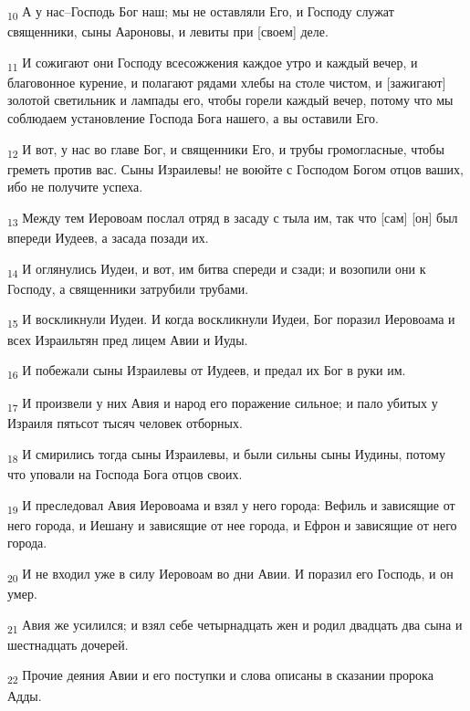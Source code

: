 \begin{tcolorbox}
\textsubscript{10} А у нас--Господь Бог наш; мы не оставляли Его, и Господу служат священники, сыны Аароновы, и левиты при [своем] деле.
\end{tcolorbox}
\begin{tcolorbox}
\textsubscript{11} И сожигают они Господу всесожжения каждое утро и каждый вечер, и благовонное курение, и полагают рядами хлебы на столе чистом, и [зажигают] золотой светильник и лампады его, чтобы горели каждый вечер, потому что мы соблюдаем установление Господа Бога нашего, а вы оставили Его.
\end{tcolorbox}
\begin{tcolorbox}
\textsubscript{12} И вот, у нас во главе Бог, и священники Его, и трубы громогласные, чтобы греметь против вас. Сыны Израилевы! не воюйте с Господом Богом отцов ваших, ибо не получите успеха.
\end{tcolorbox}
\begin{tcolorbox}
\textsubscript{13} Между тем Иеровоам послал отряд в засаду с тыла им, так что [сам] [он] был впереди Иудеев, а засада позади их.
\end{tcolorbox}
\begin{tcolorbox}
\textsubscript{14} И оглянулись Иудеи, и вот, им битва спереди и сзади; и возопили они к Господу, а священники затрубили трубами.
\end{tcolorbox}
\begin{tcolorbox}
\textsubscript{15} И воскликнули Иудеи. И когда воскликнули Иудеи, Бог поразил Иеровоама и всех Израильтян пред лицем Авии и Иуды.
\end{tcolorbox}
\begin{tcolorbox}
\textsubscript{16} И побежали сыны Израилевы от Иудеев, и предал их Бог в руки им.
\end{tcolorbox}
\begin{tcolorbox}
\textsubscript{17} И произвели у них Авия и народ его поражение сильное; и пало убитых у Израиля пятьсот тысяч человек отборных.
\end{tcolorbox}
\begin{tcolorbox}
\textsubscript{18} И смирились тогда сыны Израилевы, и были сильны сыны Иудины, потому что уповали на Господа Бога отцов своих.
\end{tcolorbox}
\begin{tcolorbox}
\textsubscript{19} И преследовал Авия Иеровоама и взял у него города: Вефиль и зависящие от него города, и Иешану и зависящие от нее города, и Ефрон и зависящие от него города.
\end{tcolorbox}
\begin{tcolorbox}
\textsubscript{20} И не входил уже в силу Иеровоам во дни Авии. И поразил его Господь, и он умер.
\end{tcolorbox}
\begin{tcolorbox}
\textsubscript{21} Авия же усилился; и взял себе четырнадцать жен и родил двадцать два сына и шестнадцать дочерей.
\end{tcolorbox}
\begin{tcolorbox}
\textsubscript{22} Прочие деяния Авии и его поступки и слова описаны в сказании пророка Адды.
\end{tcolorbox}
